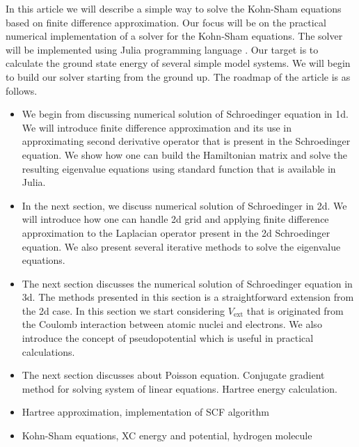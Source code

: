 In this article we will describe a simple way to solve the Kohn-Sham equations based on
finite difference approximation.
Our focus will be on the practical numerical implementation
of a solver for the Kohn-Sham equations.
The solver will be implemented using Julia programming language \cite{juliaorg}.
Our target is to calculate the ground state energy
of several simple model systems. We will begin to build our solver starting from the ground up.
The roadmap of the article is as follows.
\begin{itemize}
\item We begin from discussing numerical solution of Schroedinger equation in 1d.
  We will introduce finite difference approximation and its use in
  approximating second derivative operator that is present in the Schroedinger equation.
  We show how one can build the Hamiltonian matrix and
  solve the resulting eigenvalue equations using standard function that is available in Julia.
\item In the next section, we discuss numerical solution of Schroedinger in 2d. We will introduce
  how one can handle 2d grid and applying finite difference approximation to the Laplacian
  operator present in the 2d Schroedinger equation. We also present several iterative methods
  to solve the eigenvalue equations.
\item The next section discusses the numerical solution of Schroedinger equation in 3d. The methods
  presented in this section is a straightforward extension from the 2d case.
  In this section we start considering $V_{\mathrm{ext}}$ that is originated from the
  Coulomb interaction between atomic nuclei and electrons. We also introduce the concept of
  pseudopotential which is useful in practical calculations.
\item The next section discusses about Poisson equation. Conjugate gradient method for
  solving system of linear equations. Hartree energy calculation.
\item Hartree approximation, implementation of SCF algorithm
\item Kohn-Sham equations, XC energy and potential, hydrogen molecule
\end{itemize}